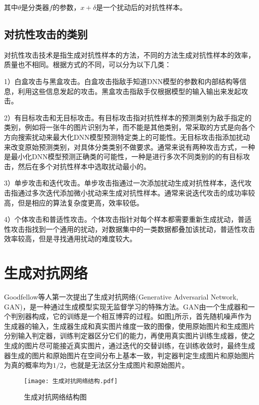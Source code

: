 其中$\theta$是分类器$f$的参数，$x + \delta$是一个扰动后的对抗性样本。
 
 \subsection{对抗性攻击的类别}

对抗性攻击技术是指生成对抗性样本的方法，不同的方法生成对抗性样本的效率，质量也不相同。根据方式的不同，可以分为以下几类：

1）白盒攻击与黑盒攻击。白盒攻击指敌手知道DNN模型的参数和内部结构等信息，利用这些信息发起的攻击。黑盒攻击指敌手仅根据模型的输入输出来发起攻击。

2）有目标攻击和无目标攻击。有目标攻击指对抗性样本的预测类别为敌手指定的类别，例如将一张牛的图片识别为羊，而不能是其他类别，常采取的方式是向各个方向搜索扰动来最大化DNN模型预测特定类上的可能性。无目标攻击指添加扰动来改变原始预测类别，对具体分类类别不做要求。通常来说有两种攻击方式，一种是最小化DNN模型预测正确类的可能性，一种是进行多次不同类别的的有目标攻击，然后在多个对抗性样本中选取扰动最小的。
	
3）单步攻击和迭代攻击。单步攻击指通过一次添加扰动生成对抗性样本，迭代攻击指通过多次迭代添加微小扰动来生成对抗性样本。通常来说迭代攻击的成功率较高，但是相应的算法复杂度更高，效率较低。
	
4）个体攻击和普适性攻击。个体攻击指针对每个样本都需要重新生成扰动，普适性攻击指找到一个通用的扰动，对数据集中的一类数据都叠加该扰动，普适性攻击效率较高，但是寻找通用扰动的难度较大。

\section{生成对抗网络}

Goodfellow等人\cite{goodfellow2014generative}第一次提出了生成对抗网络(Generative Adversarial Network, GAN)，是一种通过生成模型实现无监督学习的特殊方法。GAN由一个生成器和一个判别器构成，它的训练是一个相互博弈的过程。如图\ref{生成对抗网络结构图}所示，首先随机噪声作为生成器的输入，生成器生成和真实图片维度一致的图像，使用原始图片和生成图片分别输入判定器，训练判定器区分它们的能力，再使用真实图片训练生成器，使之生成的图片尽可能接近真实图片，通过迭代的交替训练，在训练收敛时，最终生成器生成的图片和原始图片在空间分布上基本一致，判定器判定生成图片和原始图片为真的概率均为$1/2$，也就是无法区分生成图片和原始图片。

\begin{figure}[htbp]%
	\centering
	\setlength{\abovecaptionskip}{3mm} %
	\setlength{\belowcaptionskip}{-3mm} %
	\texttt{[image: 生成对抗网络结构.pdf]}
	\caption{生成对抗网络结构图}
	\label{生成对抗网络结构图}
	\end {figure}

